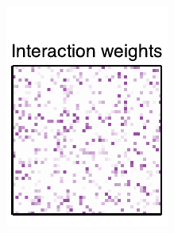 \documentclass[aos,noinfoline]{imsart} %
\begin{document}
\begin{figure}[t!]
\begin{subfigure}[T]{1.2in}
    \includegraphics[width=\textwidth]{network4}
  \end{subfigure}
    ~
  \begin{subfigure}[T]{1.2in}

\end{subfigure}
\end{figure}
\end{document}
